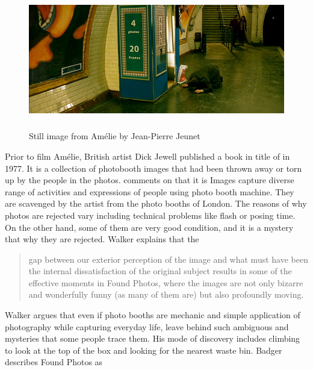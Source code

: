 \begin{figure}[h!]
  \centering
  \includegraphics[height=6cm]{graphics/amelie_01.jpg}
  \caption{Still image from Amélie by Jean-Pierre Jeunet}
  \label{fig:Amelie}
\end{figure}

Prior to film Amélie, British artist Dick Jewell published a book in title of  in 1977. It is a collection of photobooth images that had been thrown away or torn up by the people in the photos. \cite{walker2010dick} comments on that it is  Images capture diverse range of activities and expressions of people using photo booth machine. They are scavenged by the artist from the photo booths of London. The reasons of why photos are rejected vary including technical problems like flash or posing time. On the other hand, some of them are very good condition, and it is a mystery that why they are rejected. Walker explains that the 

\begin{quote}
gap between our exterior perception of the image and what must have been the internal dissatisfaction of the original subject results in some of the effective moments in Found Photos, where the images are not only bizarre and wonderfully funny (as many of them are) but also profoundly moving.
\end{quote}

Walker argues that even if photo booths are mechanic and simple application of photography while capturing everyday life, leave behind such ambiguous and mysteries that some people trace them.  His mode of discovery includes climbing to look at the top of the box and looking for the nearest waste bin. Badger describes Found Photos as 

